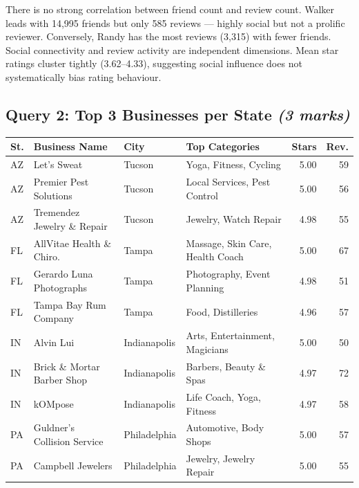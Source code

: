\documentclass[12pt,a4paper]{article}
\newcommand{\marks}[1]{\hfill\textit{(#1 marks)}}
\begin{document}
There is no strong correlation between friend count and review count. Walker
leads with 14,995 friends but only 585 reviews --- highly social but not a
prolific reviewer. Conversely, Randy has the most reviews (3,315) with fewer
friends. Social connectivity and review activity are independent dimensions.
Mean star ratings cluster tightly (3.62--4.33), suggesting social influence
does not systematically bias rating behaviour.

\subsection{Query 2: Top 3 Businesses per State \marks{3}}

\begin{table}[H]
  \centering
  \footnotesize
  \setlength{\tabcolsep}{4pt}
  \begin{tabularx}{\textwidth}{llp{2.2cm}>{\raggedright\arraybackslash}Xrr}
    \toprule
    \textbf{St.} & \textbf{Business Name} & \textbf{City} & \textbf{Top Categories} & \textbf{Stars} & \textbf{Rev.} \\
    \midrule
    AZ & Let's Sweat                  & Tucson       & Yoga, Fitness, Cycling          & 5.00 & 59 \\
    AZ & Premier Pest Solutions       & Tucson       & Local Services, Pest Control    & 5.00 & 56 \\
    AZ & Tremendez Jewelry \& Repair  & Tucson       & Jewelry, Watch Repair           & 4.98 & 55 \\
    FL & AllVitae Health \& Chiro.    & Tampa        & Massage, Skin Care, Health Coach & 5.00 & 67 \\
    FL & Gerardo Luna Photographs     & Tampa        & Photography, Event Planning     & 4.98 & 51 \\
    FL & Tampa Bay Rum Company        & Tampa        & Food, Distilleries              & 4.96 & 57 \\
    IN & Alvin Lui                    & Indianapolis & Arts, Entertainment, Magicians  & 5.00 & 50 \\
    IN & Brick \& Mortar Barber Shop  & Indianapolis & Barbers, Beauty \& Spas         & 4.97 & 72 \\
    IN & kOMpose                      & Indianapolis & Life Coach, Yoga, Fitness       & 4.97 & 58 \\
    PA & Guldner's Collision Service  & Philadelphia & Automotive, Body Shops          & 5.00 & 57 \\
    PA & Campbell Jewelers            & Philadelphia & Jewelry, Jewelry Repair         & 5.00 & 55 \\

\end{tabularx}
\end{table}
\end{document}
